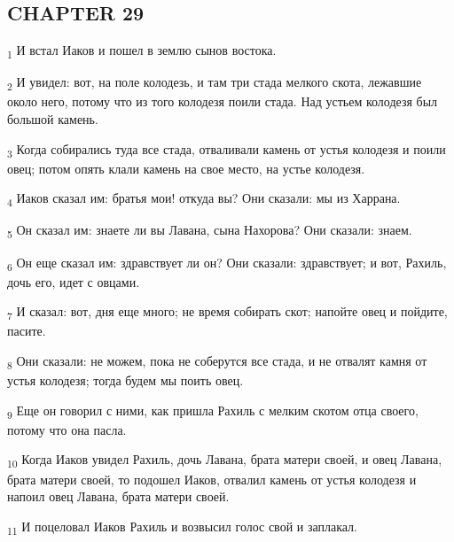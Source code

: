 \subsection{CHAPTER 29}
\begin{tcolorbox}
\textsubscript{1} И встал Иаков и пошел в землю сынов востока.
\end{tcolorbox}
\begin{tcolorbox}
\textsubscript{2} И увидел: вот, на поле колодезь, и там три стада мелкого скота, лежавшие около него, потому что из того колодезя поили стада. Над устьем колодезя был большой камень.
\end{tcolorbox}
\begin{tcolorbox}
\textsubscript{3} Когда собирались туда все стада, отваливали камень от устья колодезя и поили овец; потом опять клали камень на свое место, на устье колодезя.
\end{tcolorbox}
\begin{tcolorbox}
\textsubscript{4} Иаков сказал им: братья мои! откуда вы? Они сказали: мы из Харрана.
\end{tcolorbox}
\begin{tcolorbox}
\textsubscript{5} Он сказал им: знаете ли вы Лавана, сына Нахорова? Они сказали: знаем.
\end{tcolorbox}
\begin{tcolorbox}
\textsubscript{6} Он еще сказал им: здравствует ли он? Они сказали: здравствует; и вот, Рахиль, дочь его, идет с овцами.
\end{tcolorbox}
\begin{tcolorbox}
\textsubscript{7} И сказал: вот, дня еще много; не время собирать скот; напойте овец и пойдите, пасите.
\end{tcolorbox}
\begin{tcolorbox}
\textsubscript{8} Они сказали: не можем, пока не соберутся все стада, и не отвалят камня от устья колодезя; тогда будем мы поить овец.
\end{tcolorbox}
\begin{tcolorbox}
\textsubscript{9} Еще он говорил с ними, как пришла Рахиль с мелким скотом отца своего, потому что она пасла.
\end{tcolorbox}
\begin{tcolorbox}
\textsubscript{10} Когда Иаков увидел Рахиль, дочь Лавана, брата матери своей, и овец Лавана, брата матери своей, то подошел Иаков, отвалил камень от устья колодезя и напоил овец Лавана, брата матери своей.
\end{tcolorbox}
\begin{tcolorbox}
\textsubscript{11} И поцеловал Иаков Рахиль и возвысил голос свой и заплакал.
\end{tcolorbox}
